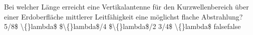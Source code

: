     {Bei welcher Länge erreicht eine Vertikalantenne für den Kurzwellenbereich über einer Erdoberfläche mittlerer Leitfähigkeit eine möglichst flache Abstrahlung?}
    {5/8\$ \textbackslash\{\}lambda\$}
    {\$\textbackslash\{\}lambda\$/4}
    {\$\textbackslash\{\}lambda\$/2}
    {3/4\$ \textbackslash\{\}lambda\$}
    {false}{false}